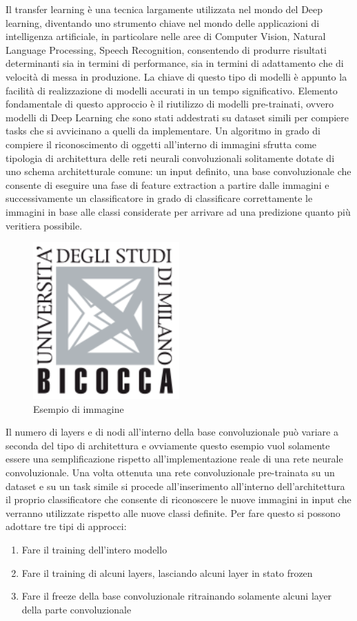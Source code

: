 Il transfer learning è una tecnica largamente utilizzata nel mondo del Deep learning, diventando uno strumento chiave nel mondo delle applicazioni di intelligenza artificiale, in particolare nelle aree di Computer Vision, Natural Language Processing, Speech Recognition, consentendo di produrre risultati determinanti sia in termini di performance, sia in termini di adattamento che di velocità di messa in produzione.  
La chiave di questo tipo di modelli è appunto la facilità di realizzazione di modelli accurati in un tempo significativo.  
Elemento fondamentale di questo approccio è il riutilizzo di modelli pre-trainati, ovvero modelli di Deep Learning che sono stati addestrati su dataset simili per compiere tasks che si avvicinano a quelli da implementare.  
Un algoritmo in grado di compiere il riconoscimento di oggetti all'interno di immagini sfrutta come tipologia di architettura delle reti neurali convoluzionali solitamente dotate di uno schema architetturale comune: un input definito, una base convoluzionale che consente di eseguire una fase di feature extraction a partire dalle immagini e successivamente un classificatore in grado di classificare correttamente le immagini in base alle classi considerate per arrivare ad una predizione quanto più veritiera possibile. 

\begin{figure}
    \centering
    \includegraphics[width=0.5\textwidth]{./logo.png}
    \caption{Esempio di immagine} 
    \label{fig:logo}
\end{figure}
Il numero di layers e di nodi all'interno della base convoluzionale può variare a seconda del tipo di architettura e ovviamente questo esempio vuol solamente essere una semplificazione rispetto all'implementazione reale di una rete neurale convoluzionale.  
Una volta ottenuta una rete convoluzionale pre-trainata su un dataset e su un task simile si procede all'inserimento all'interno dell'architettura il proprio classificatore che consente di riconoscere le nuove immagini in input che verranno utilizzate rispetto alle nuove classi definite.  
Per fare questo si possono adottare tre tipi di approcci:
\begin{enumerate}
\item Fare il training dell'intero modello
\item Fare il training di alcuni layers, lasciando alcuni layer in stato frozen
\item Fare il freeze della base convoluzionale ritrainando solamente alcuni layer della parte convoluzionale
\end{enumerate}
  
